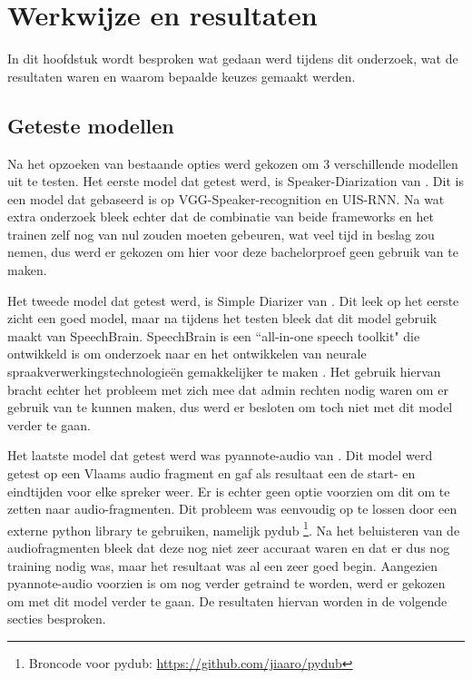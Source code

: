 
\chapter{Werkwijze en resultaten}%
\label{ch:resultaten}
In dit hoofdstuk wordt besproken wat gedaan werd tijdens dit onderzoek, wat de resultaten waren en waarom bepaalde keuzes gemaakt werden.

\section{Geteste modellen}
\label{sec:modellen}
Na het opzoeken van bestaande opties werd gekozen om 3 verschillende modellen uit te testen. Het eerste model dat getest werd, is Speaker-Diarization van \textcite{DongLu}. Dit is een model dat gebaseerd is op VGG-Speaker-recognition en UIS-RNN. Na wat extra onderzoek bleek echter dat de combinatie van beide frameworks en het trainen zelf nog van nul zouden moeten gebeuren, wat veel tijd in beslag zou nemen, dus werd er gekozen om hier voor deze bachelorproef geen gebruik van te maken.

Het tweede model dat getest werd, is Simple Diarizer van \textcite{Chau}. Dit leek op het eerste zicht een goed model, maar na tijdens het testen bleek dat dit model gebruik maakt van SpeechBrain. SpeechBrain is een ``all-in-one speech toolkit" die ontwikkeld is om onderzoek naar en het ontwikkelen van neurale spraakverwerkingstechnologieën gemakkelijker te maken \autocite{speechbrain}. Het gebruik hiervan bracht echter het probleem met zich mee dat admin rechten nodig waren om er gebruik van te kunnen maken, dus werd er besloten om toch niet met dit model verder te gaan.

Het laatste model dat getest werd was pyannote-audio van \textcite{Bredin2024}. Dit model werd getest op een Vlaams audio fragment en gaf als resultaat een de start- en eindtijden voor elke spreker weer. Er is echter geen optie voorzien om dit om te zetten naar audio-fragmenten. Dit probleem was eenvoudig op te lossen door een externe python library te gebruiken, namelijk pydub \footnote{Broncode voor pydub: \url{https://github.com/jiaaro/pydub}}. Na het beluisteren van de audiofragmenten bleek dat deze nog niet zeer accuraat waren en dat er dus nog training nodig was, maar het resultaat was al een zeer goed begin. Aangezien pyannote-audio voorzien is om nog verder getraind te worden, werd er gekozen om met dit model verder te gaan. De resultaten hiervan worden in de volgende secties besproken.

